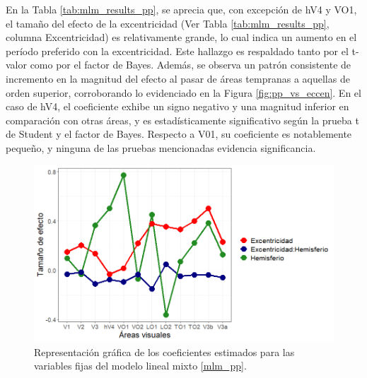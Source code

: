 


En la Tabla \ref{tab:mlm_results_pp}, se aprecia que, con excepción de hV4 y VO1, el tamaño del efecto de la excentricidad (Ver Tabla \ref{tab:mlm_results_pp}, columna Excentricidad) es relativamente grande, lo cual indica un aumento en el per\'iodo preferido con la excentricidad. Este hallazgo es respaldado tanto por el t-valor como por el factor de Bayes. Además, se observa un patrón consistente de incremento en la magnitud del efecto al pasar de áreas tempranas a aquellas de orden superior, corroborando lo evidenciado en la Figura \ref{fig:pp_vs_eccen}. En el caso de hV4, el coeficiente exhibe un signo negativo y una magnitud inferior en comparación con otras áreas, y es estadísticamente significativo según la prueba t de Student y el factor de Bayes. Respecto a V01, su coeficiente es notablemente pequeño, y ninguna de las pruebas mencionadas evidencia significancia.

\begin{figure}[h]
	\centering
	\includegraphics[scale=0.6]{Graphics/effect_size_coef_pp}
	\caption{Representación gráfica de los coeficientes estimados para las variables fijas del modelo lineal mixto \ref{mlm_pp}.}
	\label{fig:coeff}
\end{figure}

